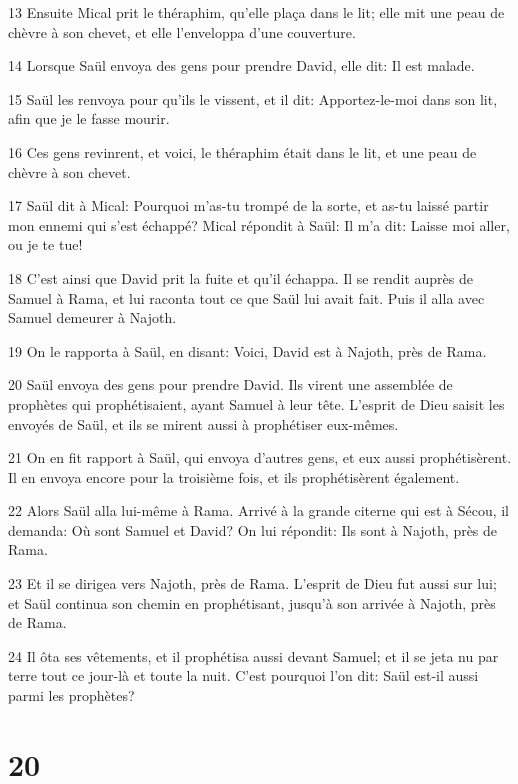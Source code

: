 \par 13 Ensuite Mical prit le théraphim, qu'elle plaça dans le lit; elle mit une peau de chèvre à son chevet, et elle l'enveloppa d'une couverture.
\par 14 Lorsque Saül envoya des gens pour prendre David, elle dit: Il est malade.
\par 15 Saül les renvoya pour qu'ils le vissent, et il dit: Apportez-le-moi dans son lit, afin que je le fasse mourir.
\par 16 Ces gens revinrent, et voici, le théraphim était dans le lit, et une peau de chèvre à son chevet.
\par 17 Saül dit à Mical: Pourquoi m'as-tu trompé de la sorte, et as-tu laissé partir mon ennemi qui s'est échappé? Mical répondit à Saül: Il m'a dit: Laisse moi aller, ou je te tue!
\par 18 C'est ainsi que David prit la fuite et qu'il échappa. Il se rendit auprès de Samuel à Rama, et lui raconta tout ce que Saül lui avait fait. Puis il alla avec Samuel demeurer à Najoth.
\par 19 On le rapporta à Saül, en disant: Voici, David est à Najoth, près de Rama.
\par 20 Saül envoya des gens pour prendre David. Ils virent une assemblée de prophètes qui prophétisaient, ayant Samuel à leur tête. L'esprit de Dieu saisit les envoyés de Saül, et ils se mirent aussi à prophétiser eux-mêmes.
\par 21 On en fit rapport à Saül, qui envoya d'autres gens, et eux aussi prophétisèrent. Il en envoya encore pour la troisième fois, et ils prophétisèrent également.
\par 22 Alors Saül alla lui-même à Rama. Arrivé à la grande citerne qui est à Sécou, il demanda: Où sont Samuel et David? On lui répondit: Ils sont à Najoth, près de Rama.
\par 23 Et il se dirigea vers Najoth, près de Rama. L'esprit de Dieu fut aussi sur lui; et Saül continua son chemin en prophétisant, jusqu'à son arrivée à Najoth, près de Rama.
\par 24 Il ôta ses vêtements, et il prophétisa aussi devant Samuel; et il se jeta nu par terre tout ce jour-là et toute la nuit. C'est pourquoi l'on dit: Saül est-il aussi parmi les prophètes?

\chapter{20}

